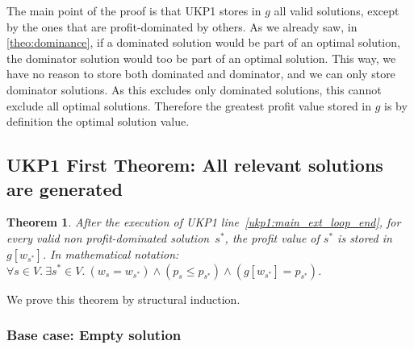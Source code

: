 \documentclass[12pt]{article}
\newtheorem{theorem}{Theorem}
\begin{document}
The main point of the proof is that UKP1 stores in \(g\) all valid solutions, except by the ones that are profit-dominated by others. As we already saw, in \autoref{theo:dominance}, if a dominated solution would be part of an optimal solution, the dominator solution would too be part of an optimal solution. This way, we have no reason to store both dominated and dominator, and we can only store dominator solutions. As this excludes only dominated solutions, this cannot exclude all optimal solutions. Therefore the greatest profit value stored in \(g\) is by definition the optimal solution value.

\subsection{UKP1 First Theorem: All relevant solutions are generated}


\begin{theorem}\label{theo:ukp1:all_relevant_solutions_present}
After the execution of UKP1 line~\ref{ukp1:main_ext_loop_end}, for every valid non profit-dominated solution~\(s^*\), the profit value of \(s^*\) is stored in \(g[w_{s^*}]\). In mathematical notation: \(\forall s \in V.~\exists s^* \in V.~(w_s = w_{s^*}) \land (p_s \leq p_{s^*}) \land (g[w_{s^*}] = p_{s^*})\).
\end{theorem}

\vspace{0.3cm}
\noindent
We prove this theorem by structural induction.

\subsubsection{Base case: Empty solution}
\label{ukp1:empty_solution_proof}
\end{document}
